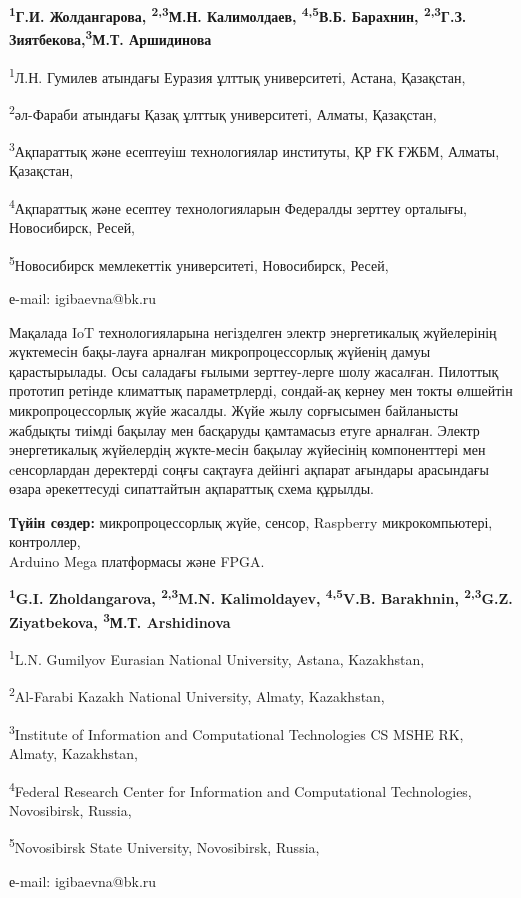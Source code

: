 \begin{center}
{\bfseries \textsuperscript{1}Г.И. Жолдангарова, \textsuperscript{2,3}М.Н.
Калимолдаев, \textsuperscript{4,5}В.Б. Барахнин,
\textsuperscript{2,3}Г.З. Зиятбекова\envelope,\textsuperscript{3}М.Т. Аршидинова}

\textsuperscript{1}Л.Н. Гумилев атындағы Еуразия ұлттық университеті,
Астана, Қазақстан,

\textsuperscript{2}әл-Фараби атындағы Қазақ ұлттық университеті, Алматы,
Қазақстан,

\textsuperscript{3}Ақпараттық және есептеуіш технологиялар институты, ҚР
ҒК ҒЖБМ, Алматы, Қазақстан,

\textsuperscript{4}Ақпараттық және есептеу технологияларын Федералды
зерттеу орталығы, Новосибирск, Ресей,

\textsuperscript{5}Новосибирск мемлекеттік университеті, Новосибирск,
Ресей,

е-mail: igibaevna@bk.ru
\end{center}

Мақалада IoT технологияларына негізделген электр энергетикалық
жүйелерінің жүктемесін бақы-лауға арналған микропроцессорлық жүйенің
дамуы қарастырылады. Осы саладағы ғылыми зерттеу-лерге шолу жасалған.
Пилоттық прототип ретінде климаттық параметрлерді, сондай-ақ кернеу мен
токты өлшейтін микропроцессорлық жүйе жасалды. Жүйе жылу сорғысымен
байланысты жабдықты тиімді бақылау мен басқаруды қамтамасыз етуге
арналған. Электр энергетикалық жүйелердің жүкте-месін бақылау жүйесінің
компоненттері мен cенсорлардан деректерді соңғы сақтауға дейінгі ақпарат
ағындары арасындағы өзара әрекеттесуді сипаттайтын ақпараттық схема
құрылды.

{\bfseries Түйін сөздер:} микропроцессорлық жүйе, сенсор, Raspberry
микрокомпьютері, контроллер, \\Arduino Mega платформасы және FPGA.



\begin{center}
{\bfseries \textsuperscript{1}G.I. Zholdangarova, \textsuperscript{2,3}M.N.
Kalimoldayev, \textsuperscript{4,5}V.B. Barakhnin,
\textsuperscript{2,3}G.Z. Ziyatbekova\envelope, \textsuperscript{3}М.Т. Arshidinova}

\textsuperscript{1}L.N. Gumilyov Eurasian National University, Astana,
Kazakhstan,

\textsuperscript{2}Al-Farabi Kazakh National University, Almaty,
Kazakhstan,

\textsuperscript{3}Institute of Information and Computational
Technologies CS MSHE RK, Almaty, Kazakhstan,

\textsuperscript{4}Federal Research Center for Information and
Computational Technologies, Novosibirsk, Russia,

\textsuperscript{5}Novosibirsk State University, Novosibirsk, Russia,

е-mail: igibaevna@bk.ru
\end{center}

